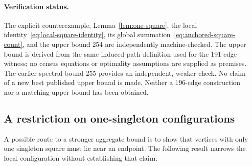 \documentclass[11pt,a4paper]{article}
\theoremstyle{definition}
\theoremstyle{remark}
\begin{document}
\paragraph{Verification status.}
The explicit counterexample, Lemma~\ref{lem:one-square}, the local identity~\eqref{eq:local-square-identity}, its global summation~\eqref{eq:anchored-square-count}, and the upper bound 254 are independently machine-checked. The upper bound is derived from the same induced-path definition used for the 191-edge witness; no census equations or optimality assumptions are supplied as premises. The earlier spectral bound 255 provides an independent, weaker check. No claim of a new best published upper bound is made. Neither a 196-edge construction nor a matching upper bound has been obtained.

\subsection{A restriction on one-singleton configurations}
A possible route to a stronger aggregate bound is to show that vertices with only one singleton square must lie near an endpoint. The following result narrows the local configuration without establishing that claim.
\end{document}
